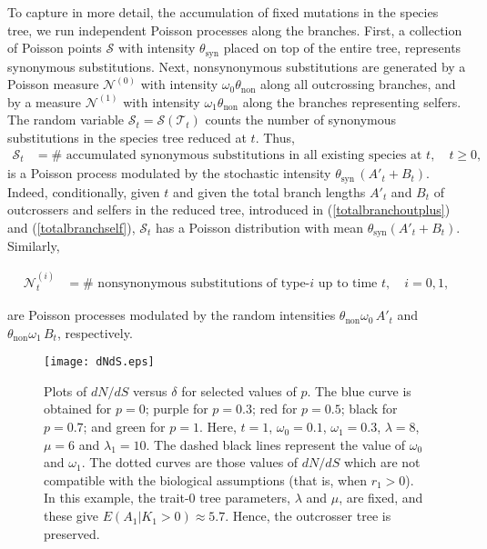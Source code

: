 \documentclass[a4paper,11pt]{article}
\theoremstyle{plain}
\theoremstyle{definition}
\numberwithin{equation}{section}
\begin{document}
To capture in more detail, the accumulation of fixed mutations in the
species tree, we run independent Poisson processes along the
branches. First, a collection of Poisson points $\mathcal{S}$ with
intensity $\theta_\mathrm{syn}$ placed on top of the entire tree,
represents synonymous substitutions.  Next, nonsynonymous substitutions
are generated by a Poisson measure $\mathcal{N}^{(0)}$
with intensity $\omega_0\theta_\mathrm{non}$ along all
outcrossing branches, and by a measure $\mathcal{N}^{(1)}$ with intensity
$\omega_1\theta_\mathrm{non}$ along the branches representing selfers.  
The random variable $\mathcal{S}_{t}=\mathcal{S}(\mathcal T_t)$ counts the number of synonymous
substitutions in the species tree reduced at $t$. Thus, 
\begin{align*}
\mathcal{S}_{t}&=\mbox{$\#$ accumulated synonymous substitutions in all existing species at
  $t$}, \quad t\ge 0,
\end{align*}
is a Poisson process modulated by the stochastic intensity
$\theta_\mathrm{syn}\, (A'_t+B_t)$. Indeed, conditionally, given $t$
and given the total branch lengths $A'_t$ and $B_t$ of outcrossers and selfers
in the reduced tree, introduced in (\ref{totalbranchoutplus}) and
(\ref{totalbranchself}), $\mathcal{S}_{t}$ has a Poisson distribution with mean
$\theta_\mathrm{syn}(A'_t+B_t)$.  Similarly,

\begin{align*}
\mathcal{N}^{(i)}_t&=\mbox{$\#$ nonsynonymous substitutions of type-$i$ up to
  time $t$}, \quad i=0,1,
\end{align*}

\noindent are Poisson processes modulated by the random intensities
$\theta_\mathrm{non}\omega_0\, A'_t$ and $\theta_\mathrm{non}\omega_1\,
B_t$, respectively.  

\begin{figure*}[!t]
\centerline{\texttt{[image: dNdS.eps]}}  
\caption{ Plots of $dN/dS$ versus $\delta$ for selected values of $p$. 
The blue curve is obtained for $p=0$; purple for $p=0.3$;
  red for $p=0.5$; black for $p=0.7$; and green for $p=1$.
  Here, $t=1$, $\omega_0=0.1$, $\omega_1=0.3$, $\lambda=8$,
  $\mu=6$ and $\lambda_1=10$. The dashed black lines represent 
  the value of $\omega_0$ and $\omega_1$. The dotted curves are those values 
  of $dN/dS$ which are not compatible with the biological assumptions (that is, when 
  $r_1>0$). In this example, the trait-$0$ tree parameters, $\lambda$ and $\mu$, 
  are fixed, and these give $E(A_1|K_1>0)\approx 5.7$. Hence, the outcrosser tree is preserved. }
  \label{dNdSvsdelta_p}    
\end{figure*}
\end{document}
